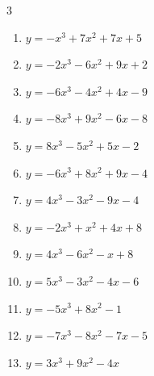 \begin{multicols}{3}
\begin{enumerate}
  \item $y=-x^{3}+7x^{2}+7x+5$


  \item $y=-2x^{3}-6x^{2}+9x+2$


  \item $y=-6x^{3}-4x^{2}+4x-9$


  \item $y=-8x^{3}+9x^{2}-6x-8$


  \item $y=8x^{3}-5x^{2}+5x-2$


  \item $y=-6x^{3}+8x^{2}+9x-4$


  \item $y=4x^{3}-3x^{2}-9x-4$


  \item $y=-2x^{3}+x^{2}+4x+8$


  \item $y=4x^{3}-6x^{2}-x+8$


  \item $y=5x^{3}-3x^{2}-4x-6$


  \item $y=-5x^{3}+8x^{2}-1$


  \item $y=-7x^{3}-8x^{2}-7x-5$


  \item $y=3x^{3}+9x^{2}-4x$


\end{enumerate}
\end{multicols}
